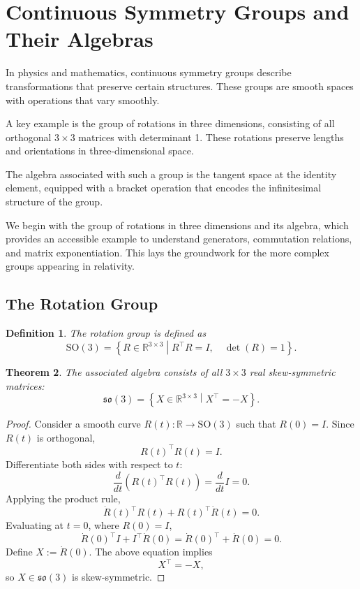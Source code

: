 \documentclass{amsart}
\newtheorem{theorem}{Theorem}[section]
\newtheorem{definition}[theorem]{Definition}
\theoremstyle{remark}
\begin{document}
\section{Continuous Symmetry Groups and Their Algebras}
\label{sec:groups}

In physics and mathematics, continuous symmetry groups describe transformations that preserve certain structures. These groups are smooth spaces with operations that vary smoothly.

A key example is the group of rotations in three dimensions, consisting of all orthogonal \(3 \times 3\) matrices with determinant 1. These rotations preserve lengths and orientations in three-dimensional space.

The algebra associated with such a group is the tangent space at the identity element, equipped with a bracket operation that encodes the infinitesimal structure of the group.

We begin with the group of rotations in three dimensions and its algebra, which provides an accessible example to understand generators, commutation relations, and matrix exponentiation. This lays the groundwork for the more complex groups appearing in relativity.

\subsection{The Rotation Group}

\begin{definition}
  The rotation group is defined as
  \[
  \mathrm{SO}(3) = \left\{ R \in \mathbb{R}^{3 \times 3} \middle| R^\top R = I, \quad \det(R) = 1 \right\}.
  \]
\end{definition}

\begin{theorem}
  The associated algebra consists of all $3 \times 3$ real skew-symmetric matrices:
  \[
  \mathfrak{so}(3) = \left\{ X \in \mathbb{R}^{3 \times 3} \middle| X^\top = -X \right\}.
  \]
\end{theorem}

\begin{proof}
  Consider a smooth curve $R(t): \mathbb{R} \to \mathrm{SO}(3)$ such that $R(0) = I$. Since $R(t)$ is orthogonal,
  \[
  R(t)^\top R(t) = I.
  \]
  Differentiate both sides with respect to $t$:
  \[
  \frac{d}{dt} \left( R(t)^\top R(t) \right) = \frac{d}{dt} I = 0.
  \]
  Applying the product rule,
  \[
  \dot{R}(t)^\top R(t) + R(t)^\top \dot{R}(t) = 0.
  \]
  Evaluating at $t=0$, where $R(0) = I$,
  \[
  \dot{R}(0)^\top I + I^\top \dot{R}(0) = \dot{R}(0)^\top + \dot{R}(0) = 0.
  \]
  Define $X := \dot{R}(0)$. The above equation implies
  \[
  X^\top = -X,
  \]
  so $X \in \mathfrak{so}(3)$ is skew-symmetric.
\end{proof}
\end{document}

